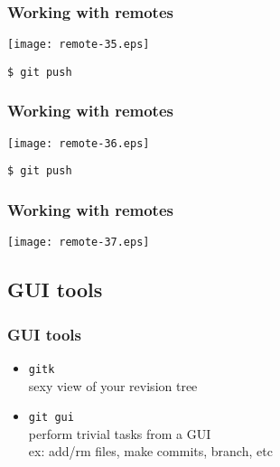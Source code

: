 \documentclass[english]{beamer}
\newcommand{\mysubsection}[2]{%
  \hypertarget{#2}{}%
  \subsection{#1}%
  \label{#2}%
}
\newcommand{\CMD}[1]{%
\texttt{\textcolor{code-green}{#1}}%
}
\begin{document}
\begin{frame}[fragile]
\frametitle{Working with remotes}

\texttt{[image: remote-35.eps]}

\begin{center}
\CMD{\$ git push}
\end{center}

\vspace{\textheight}
\end{frame}

\begin{frame}[fragile]
\frametitle{Working with remotes}

\texttt{[image: remote-36.eps]}

\begin{center}
\CMD{\$ git push}
\end{center}

\vspace{\textheight}
\end{frame}

\begin{frame}[fragile]
\frametitle{Working with remotes}

\texttt{[image: remote-37.eps]}

\vspace{\textheight}
\end{frame}


\mysubsection{GUI tools}{using:gui}
\begin{frame}
\frametitle{GUI tools}
\begin{itemize}
        \item \CMD{gitk} \\
                sexy view of your revision tree

                \pause{}
        \item \CMD{git gui} \\
                perform trivial tasks from a GUI \\
                ex: add/rm files, make commits, branch, etc
\end{itemize}
\end{frame}
\end{document}
